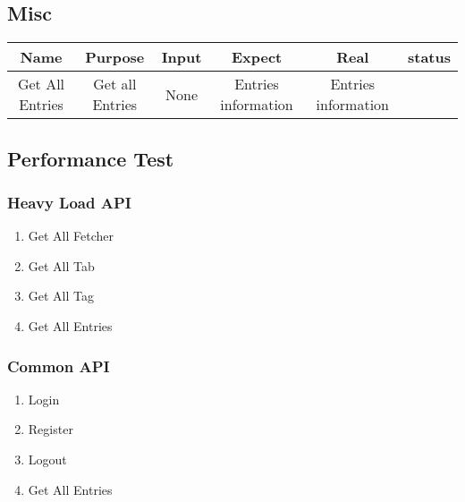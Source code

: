 \begin{landscape}
  \subsection{Misc}
  \begin{center}
    \begin{tabular}{c|c|c|c|c|c}
      \hline
      Name            & Purpose         & Input & Expect              & Real                & status \\ \hline
      Get All Entries & Get all Entries & None  & Entries information & Entries information &        \\ \hline
    \end{tabular}
  \end{center}
\end{landscape}
\subsection{Performance Test}
\subsubsection{Heavy Load API}
\begin{enumerate}
  \item Get All Fetcher
  \item Get All Tab
  \item Get All Tag
  \item Get All Entries
\end{enumerate}
\subsubsection{Common API}
\begin{enumerate}
  \item Login
  \item Register
  \item Logout
  \item Get All Entries
\end{enumerate}

